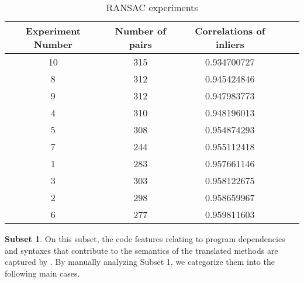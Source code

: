 
\begin{table}
	\caption{RANSAC experiments}
	\begin{tabular}{|c|c|c|c|c|}
		\hline
		Experiment Number & Number of pairs & Correlations of inliers \\
		\hline
		10	& 315	& 0.934700727 \\		
		8	& 312	& 0.945424846 \\	
		9	& 312	& 0.947983773 \\
		4	& 310	& 0.948196013 \\
		{\cellcolor[gray]{.8}}5	& {\cellcolor[gray]{.8}}308	& {\cellcolor[gray]{.8}}0.954874293 \\
		7	& 244	& 0.955112418 \\	
		1	& 283	& 0.957661146 \\
		3	& 303	& 0.958122675 \\
		2	& 298	& 0.958659967 \\
		6	& 277	& 0.959811603 \\		
		\hline
\end{tabular}
	\label{table:RANSAC_experiments}
\end{table}

%



\textbf{Subset 1}. On this subset, the code features relating to
program dependencies and syntaxes that contribute to the semantics of
the translated methods are captured by {\model}. By manually analyzing
Subset 1, we categorize them into the following main cases.

